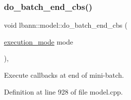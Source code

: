 \mbox{\label{classlbann_1_1model_a3dc29e9751a53afda7e171aff335273e}} 
\subsubsection{\texorpdfstring{do\+\_\+batch\+\_\+end\+\_\+cbs()}{do\_batch\_end\_cbs()}}
{\footnotesize\ttfamily void lbann\+::model\+::do\+\_\+batch\+\_\+end\+\_\+cbs (\begin{DoxyParamCaption}\item[{\hyperlink{base_8hpp_a2781a159088df64ed7d47cc91c4dc0a8}{execution\+\_\+mode}}]{mode }\end{DoxyParamCaption})\hspace{0.3cm}{\ttfamily [protected]}, {\ttfamily [virtual]}}

Execute callbacks at end of mini-\/batch. 

Definition at line 928 of file model.\+cpp.


